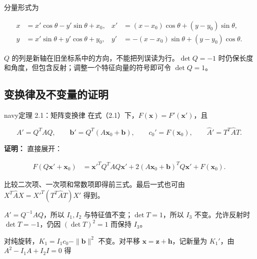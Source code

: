 \documentclass[11pt,a4paper]{article}
\begin{document}
分量形式为

\begin{equation*}
\begin{aligned}x&=x'\cos\theta-y'\sin\theta+x_0,& x'&=(x-x_0)\cos\theta+(y-y_0)\sin\theta,\\ y&=x'\sin\theta+y'\cos\theta+y_0,& y'&=-(x-x_0)\sin\theta+(y-y_0)\cos\theta.\end{aligned}\tag{2.2}
\end{equation*}

\(Q\) 的列是新轴在旧坐标系中的方向，不能把列误读为行。\(\det Q=-1\)
时仍保长度和角度，但包含反射；调整一个特征向量的符号即可令
\(\det Q=1\)。

\subsection{变换律及不变量的证明}\label{ux53d8ux6362ux5f8bux53caux4e0dux53d8ux91cfux7684ux8bc1ux660e}

\begin{sboxenv}{navy}{定理 2.1：矩阵变换律}
在式（2.1）下，\(F(\boldsymbol x)=F'(\boldsymbol x')\)，且

\begin{equation*}
A'=Q^TAQ,\qquad \boldsymbol b'=Q^T(A\boldsymbol x_0+\boldsymbol b),\qquad c_0'=F(\boldsymbol x_0),\qquad \widehat A'=T^T\widehat AT.\tag{2.3}
\end{equation*}

\end{sboxenv}

\textbf{证明：} 直接展开：

\begin{equation*}
\begin{aligned}F(Q\boldsymbol x'+\boldsymbol x_0)&=\boldsymbol x'^TQ^TAQ\boldsymbol x'+2(A\boldsymbol x_0+\boldsymbol b)^TQ\boldsymbol x'+F(\boldsymbol x_0).
\end{aligned}
\end{equation*}

比较二次项、一次项和常数项即得前三式。最后一式也可由
\(X^T\widehat AX=X'^T(T^T\widehat AT)X'\) 得到。

\(A'=Q^{-1}AQ\)，所以 \(I_1,I_2\) 与特征值不变；\(\det T=1\)，所以
\(I_3\) 不变。允许反射时 \(\det T=-1\)，仍因 \((\det T)^2=1\) 而保持
\(I_3\)。

对纯旋转，\(K_1=I_1c_0-\|\boldsymbol b\|^2\) 不变。对平移
\(\boldsymbol x=\boldsymbol z+\boldsymbol h\)，记新量为 \(K_1'\)，由
\(A^2-I_1A+I_2I=0\) 得
\end{document}
